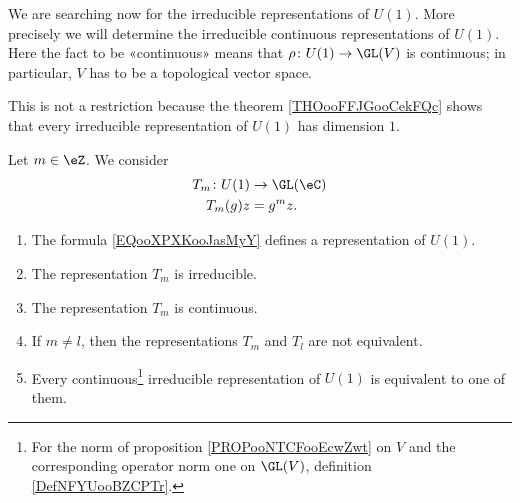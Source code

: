 \begin{normaltext}
    We are searching now for the irreducible representations of \( U(1)\). More precisely we will determine the irreducible continuous representations of \( U(1)\). Here the fact to be «continuous» means that \( \rho\colon U(1)\to \GL(V)\) is continuous; in particular, \( V\) has to be a topological vector space.

    This is not a restriction because the theorem \ref{THOooFFJGooCekFQc} shows that every irreducible representation of \( U(1)\) has dimension \( 1\).
\end{normaltext}

\begin{proposition}       \label{PROPooLWWEooUmqbRA}
    Let \( m\in \eZ\). We consider
    \begin{equation}        \label{EQooXPXKooJasMyY}
        \begin{aligned}
            T_m\colon U(1)&\to \GL(\eC) \\
            T_m(g)z&=g^mz.
        \end{aligned}
    \end{equation}
    \begin{enumerate}
        \item
            The formula \eqref{EQooXPXKooJasMyY} defines a representation of \( U(1)\).
        \item
            The representation \( T_m\) is irreducible.
        \item
            The representation \( T_m\) is continuous.
        \item
            If \( m\neq l\), then the representations \( T_m\) and \( T_l\) are not equivalent.
        \item       \label{ITEMooUPVQooQddQOJ}
            Every continuous\footnote{For the norm of proposition \ref{PROPooNTCFooEcwZwt} on \( V\) and the corresponding operator norm one on \( \GL(V)\), definition \ref{DefNFYUooBZCPTr}.} irreducible representation of \( U(1)\) is equivalent to one of them.
    \end{enumerate}
\end{proposition}

